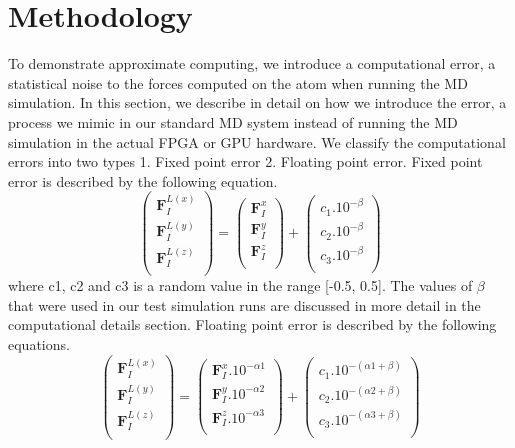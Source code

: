 \documentclass[aps,pre,twocolumn,showpacs,preprintnumbers,amsmath,amssymb]{revtex4-1}
\begin{document}
\section{Methodology}
To demonstrate approximate computing, we introduce a computational error, a statistical noise to the forces computed on the atom when running the MD simulation. In this section, we describe in detail on how we introduce the error, a process we mimic in our standard MD system instead of running the MD simulation in the actual FPGA or GPU hardware. We classify the computational errors into two types 1. Fixed point error 2. Floating point error. 
Fixed point error is described by the following equation. 
\begin{equation}
\begin{pmatrix}
\textbf{F}_{I}^{L(x)}\\ 
\textbf{F}_{I}^{L(y)}\\ 
\textbf{F}_{I}^{L(z)}\\ 

\end{pmatrix} = 
\begin{pmatrix}
\textbf{F}_{I}^{x}\\ 
\textbf{F}_{I}^{y}\\ 
\textbf{F}_{I}^{z}\\ 

\end{pmatrix} + 
\begin{pmatrix}
c_{1}.10^{-\beta }\\ 
c_{2}.10^{-\beta }\\ 
c_{3}.10^{-\beta }\\ 

\end{pmatrix}
\end{equation}
where c1, c2 and c3 is a random value in the range [-0.5, 0.5]. The values of \(\beta\) that were used in our test simulation runs are discussed in more detail in the computational details section.  
Floating point error is described by the following equations.
\begin{equation}
\begin{pmatrix}
\textbf{F}_{I}^{L(x)}\\ 
\textbf{F}_{I}^{L(y)}\\ 
\textbf{F}_{I}^{L(z)}\\ 

\end{pmatrix} = 
\begin{pmatrix}
\textbf{F}_{I}^{x}.10^{-\alpha1}\\ 
\textbf{F}_{I}^{y}.10^{-\alpha2}\\ 
\textbf{F}_{I}^{z}.10^{-\alpha3}\\ 

\end{pmatrix} + 
\begin{pmatrix}
c_{1}.10^{-(\alpha1+\beta)}\\ 
c_{2}.10^{-(\alpha2+\beta)}\\ 
c_{3}.10^{-(\alpha3+\beta)}\\ 

\end{pmatrix}
\end{equation}
\end{document}
